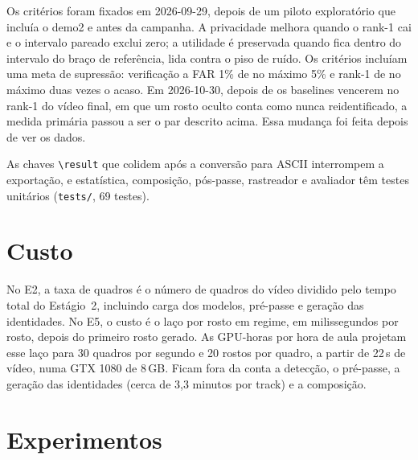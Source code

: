Os critérios foram fixados em 2026-09-29, depois de um piloto exploratório que incluía o demo2 e antes da campanha. A privacidade melhora quando o rank-1 cai e o intervalo pareado exclui zero; a utilidade é preservada quando fica dentro do intervalo do braço de referência, lida contra o piso de ruído. Os critérios incluíam uma meta de supressão: verificação a FAR 1\% de no máximo 5\% e rank-1 de no máximo duas vezes o acaso. Em 2026-10-30, depois de os baselines vencerem no rank-1 do vídeo final, em que um rosto oculto conta como nunca reidentificado, a medida primária passou a ser o par descrito acima. Essa mudança foi feita depois de ver os dados.

As chaves \texttt{\textbackslash result} que colidem após a conversão para ASCII interrompem a exportação, e estatística, composição, pós-passe, rastreador e avaliador têm testes unitários (\texttt{tests/}, 69 testes).

\section{Custo}

No E2, a taxa de quadros é o número de quadros do vídeo dividido pelo tempo total do Estágio~2, incluindo carga dos modelos, pré-passe e geração das identidades. No E5, o custo é o laço por rosto em regime, em milissegundos por rosto, depois do primeiro rosto gerado. As GPU-horas por hora de aula projetam esse laço para 30 quadros por segundo e 20 rostos por quadro, a partir de 22\,s de vídeo, numa GTX 1080 de 8\,GB. Ficam fora da conta a detecção, o pré-passe, a geração das identidades (cerca de 3,3 minutos por track) e a composição.

\section{Experimentos}

